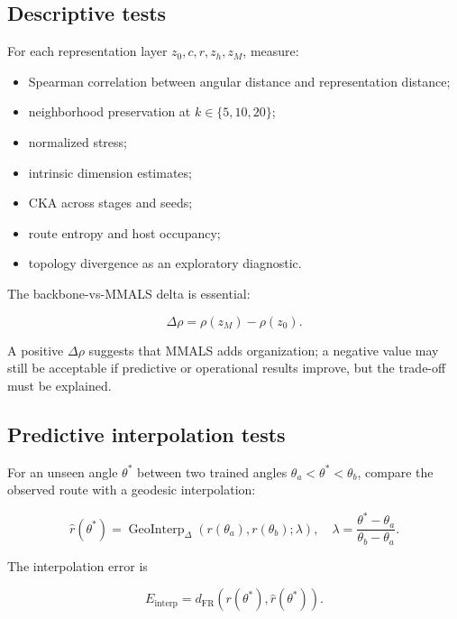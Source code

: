 \documentclass[11pt,a4paper]{article}
\begin{document}
\subsection{Descriptive tests}

For each representation layer \(z_0,c,r,z_h,z_M\), measure:

\begin{itemize}
\item Spearman correlation between angular distance and representation distance;
\item neighborhood preservation at \(k\in\{5,10,20\}\);
\item normalized stress;
\item intrinsic dimension estimates;
\item CKA across stages and seeds;
\item route entropy and host occupancy;
\item topology divergence as an exploratory diagnostic.
\end{itemize}

The backbone-vs-MMALS delta is essential:

\begin{equation}
 \Delta\rho=\rho(z_M)-\rho(z_0).
\end{equation}

A positive \(\Delta\rho\) suggests that MMALS adds organization; a negative value may still be acceptable if predictive or operational results improve, but the trade-off must be explained.

\subsection{Predictive interpolation tests}

For an unseen angle \(\theta^*\) between two trained angles \(\theta_a<\theta^*<\theta_b\), compare the observed route with a geodesic interpolation:

\begin{equation}
 \hat r(\theta^*)=\operatorname{GeoInterp}_{\Delta}
 \left(r(\theta_a),r(\theta_b);\lambda\right),
 \quad \lambda=\frac{\theta^*-\theta_a}{\theta_b-\theta_a}.
\end{equation}

The interpolation error is

\begin{equation}
 E_{\mathrm{interp}}=d_{\mathrm{FR}}\left(r(\theta^*),\hat r(\theta^*)\right).
\end{equation}
\end{document}
